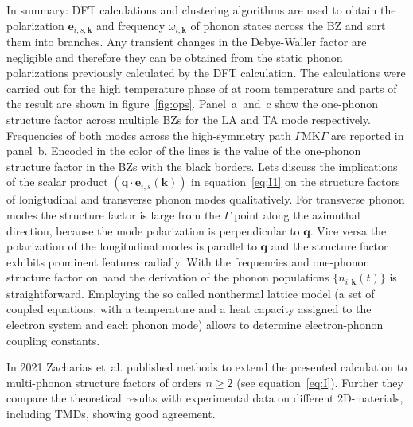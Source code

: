 In summary: \Ac{DFT} calculations and clustering algorithms are used to obtain the polarization $\mathbf{e}_{i,s,\mathbf{k}}$ and frequency $\omega_{i,\mathbf{k}}$ of phonon states across the \ac{BZ} and sort them into branches.
Any transient changes in the Debye-Waller factor are negligible and therefore they can be obtained from the static phonon polarizations previously calculated by the \ac{DFT} calculation.
The calculations were carried out for the high temperature phase of \ts at room temperature and parts of the result are shown in figure~\ref{fig:ops}.
Panel~a~and~c show the one-phonon structure factor across multiple \acp{BZ} for the \ac{LA} and \ac{TA} mode respectively.
Frequencies of both modes across the high-symmetry path $\overline{\Gamma\mathrm{MK}\Gamma}$ are reported in panel~b.
Encoded in the color of the lines is the value of the one-phonon structure factor in the \acp{BZ} with the black borders.
Lets discuss the implications of the scalar product $\left( \mathbf{q}\cdot\mathbf{e}_{i, s}(\mathbf{k}) \right)$ in equation~\ref{eq:I1} on the structure factors of lonigtudinal and transverse phonon modes qualitatively.
For transverse phonon modes the structure factor is large from the $\Gamma$ point along the azimuthal direction, because the mode polarization is perpendicular to $\mathbf{q}$.
Vice versa the polarization of the longitudinal modes is parallel to $\mathbf{q}$ and the structure factor exhibits prominent features radially.
With the frequencies and one-phonon structure factor on hand the derivation of the phonon populations $\{n_{i,\mathbf{k}}(t)\}$ is straightforward.
Employing the so called nonthermal lattice model\cite{waldecker2016} (a set of coupled equations, with a temperature and a heat capacity assigned to the electron system and each phonon mode) allows to determine electron-phonon coupling constants.

In 2021 Zacharias et~al. published methods to extend the presented calculation to multi-phonon structure factors of orders $n\geq 2$ (see equation~\ref{eq:I}).
Further they compare the theoretical results with experimental data on different 2D-materials, including \acp{TMD}, showing good agreement\cite{zacharias2021a,zacharias2021b}.

